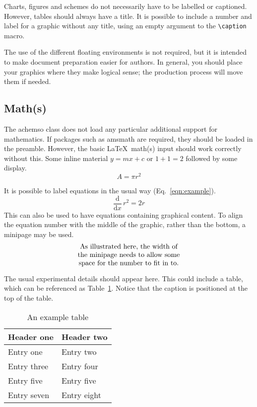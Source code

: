 \documentclass[journal=jctc, manuscript=article]{achemso}
\begin{document}
Charts, figures and schemes do not necessarily have to be labelled or
captioned.  However, tables should always have a title. It is
possible to include a number and label for a graphic without any
title, using an empty argument to the \texttt{\textbackslash caption}
macro.

The use of the different floating environments is not required, but
it is intended to make document preparation easier for authors. In
general, you should place your graphics where they make logical
sense; the production process will move them if needed.

\subsection{Math(s)}

The \textsf{achemso} class does not load any particular additional
support for mathematics.  If packages such as \textsf{amsmath} are
required, they should be loaded in the preamble.  However,
the basic \LaTeX\ math(s) input should work correctly without
this.  Some inline material \( y = mx + c \) or $ 1 + 1 = 2 $
followed by some display. \[ A = \pi r^2 \]

It is possible to label equations in the usual way (Eq.~\ref{eqn:example}).
\begin{equation}
  \frac{\mathrm{d}}{\mathrm{d}x} \, r^2 = 2r \label{eqn:example}
\end{equation}
This can also be used to have equations containing graphical
content. To align the equation number with the middle of the graphic,
rather than the bottom, a minipage may be used.
\begin{equation}
  \begin{minipage}[c]{0.80\linewidth}
    \centering
    As illustrated here, the width of \\
    the minipage needs to allow some  \\
    space for the number to fit in to.
  \end{minipage}
  \label{eqn:graphic}
\end{equation}


The usual experimental details should appear here.  This could
include a table, which can be referenced as Table~\ref{tbl:example}.
Notice that the caption is positioned at the top of the table.
\begin{table}
  \caption{An example table}
  \label{tbl:example}
  \begin{tabular}{ll}
    \hline
    Header one  & Header two  \\
    \hline
    Entry one   & Entry two   \\
    Entry three & Entry four  \\
    Entry five  & Entry five  \\
    Entry seven & Entry eight \\
    \hline
  \end{tabular}
\end{table}
\end{document}
